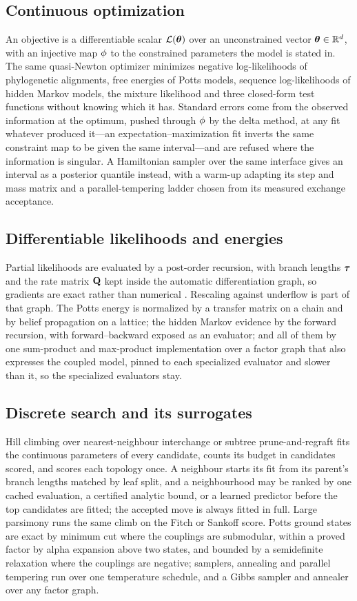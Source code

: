\documentclass[11pt,a4paper]{article}
\begin{document}
\subsection{Continuous optimization}
An objective is a differentiable scalar $\mathcal{L}(\boldsymbol{\theta})$ over an
unconstrained vector $\boldsymbol{\theta} \in \mathbb{R}^d$, with an injective map
$\phi$ to the constrained parameters the model is stated in. The same
quasi-Newton optimizer \citep{nocedal2006} minimizes negative log-likelihoods
of phylogenetic alignments, free energies of Potts models, sequence
log-likelihoods of hidden Markov models, the mixture likelihood and three
closed-form test functions without knowing which it has. Standard errors come
from the observed information at the optimum, pushed through $\phi$ by
the delta method, at any fit whatever produced it---an
expectation--maximization fit inverts the same constraint map to be given the
same interval---and are refused where the information is singular. A
Hamiltonian sampler over the same interface gives an interval as a posterior
quantile instead, with a warm-up adapting its step and mass matrix and a
parallel-tempering ladder chosen from its measured exchange acceptance.

\subsection{Differentiable likelihoods and energies}
Partial likelihoods are evaluated by a post-order recursion, with branch
lengths $\boldsymbol{\tau}$ and the rate matrix $\mathbf{Q}$ kept inside the automatic
differentiation graph, so gradients are exact rather than numerical
\citep{goodfellow2016, prince2023}. Rescaling against underflow is part of that
graph. The Potts energy is normalized by a transfer matrix on a chain and by
belief propagation on a lattice; the hidden Markov evidence by the forward
recursion, with forward--backward exposed as an evaluator; and all of them by
one sum-product and max-product implementation over a factor graph that also
expresses the coupled model, pinned to each specialized evaluator and slower
than it, so the specialized evaluators stay.

\subsection{Discrete search and its surrogates}
Hill climbing over nearest-neighbour interchange or subtree prune-and-regraft
fits the continuous parameters of every candidate, counts its budget in
candidates scored, and scores each topology once. A neighbour starts its fit
from its parent's branch lengths matched by leaf split, and a neighbourhood may
be ranked by one cached evaluation, a certified analytic bound, or a learned
predictor before the top candidates are fitted; the accepted move is always
fitted in full. Large parsimony runs the same climb on the Fitch or Sankoff
score. Potts ground states are exact by minimum cut where the couplings are
submodular, within a proved factor by alpha expansion above two states, and
bounded by a semidefinite relaxation where the couplings are negative;
samplers, annealing and parallel tempering run over one temperature schedule,
and a Gibbs sampler and annealer over any factor graph.
\end{document}
